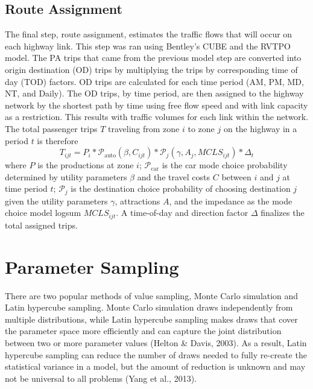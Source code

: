 \documentclass[fancy, masters,twoside]{byuthesis}
\begin{document}
\hypertarget{route-assignment}{%
\subsection{Route Assignment}\label{route-assignment}}

The final step, route assignment, estimates the traffic flows that will occur on each highway link. This step was ran using Bentley's CUBE and the RVTPO model. The PA trips that came from the previous model step are converted into origin destination (OD) trips by multiplying the trips by corresponding time of day (TOD) factors. OD trips are calculated for each time period (AM, PM, MD, NT, and Daily). The OD trips, by time period, are then assigned to the highway network by the shortest path by time using free flow speed and with link capacity as a restriction. This results with traffic volumes for each link within the network. The total passenger trips \(T\) traveling from zone \(i\) to zone \(j\) on the highway in a period \(t\) is therefore
\begin{equation}
T_{ijt} = P_i * \mathcal{P}_{\mathrm{auto}}(\beta, C_{ijt}) * \mathcal{P}_j(\gamma, A_j, MCLS_{ijt}) * \Delta_t
\label{eq:trips}
\end{equation}
where \(P\) is the productions at zone \(i\); \(\mathcal{P}_{\mathrm{car}}\) is the car mode choice probability determined by utility parameters \(\beta\) and the travel costs \(C\) between \(i\) and \(j\) at time period \(t\); \(\mathcal{P}_{j}\) is the destination choice probability of choosing destination \(j\) given the utility parameters \(\gamma\), attractions \(A\), and the impedance as the mode choice model logsum \(MCLS_{ijt}\). A time-of-day and direction factor \(\Delta\) finalizes the total assigned trips.

\hypertarget{parameter-sampling}{%
\section{Parameter Sampling}\label{parameter-sampling}}

There are two popular methods of value sampling, Monte Carlo simulation and Latin hypercube sampling. Monte Carlo simulation draws independently from multiple distributions, while Latin hypercube sampling makes draws that cover the parameter space more efficiently and can capture the joint distribution between two or more parameter values (Helton \& Davis, 2003). As a result, Latin hypercube sampling can reduce the number of draws needed to fully re-create the statistical variance in a model, but the amount of reduction is unknown and may not be universal to all problems (Yang et al., 2013).
\end{document}
